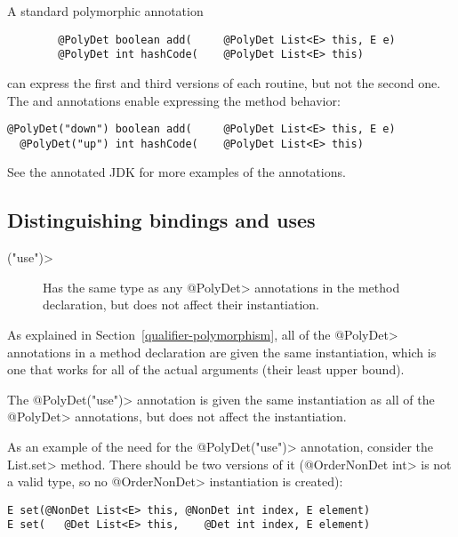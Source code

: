 A standard polymorphic annotation

\begin{Verbatim}
        @PolyDet boolean add(     @PolyDet List<E> this, E e)
        @PolyDet int hashCode(    @PolyDet List<E> this)
\end{Verbatim}

\noindent
can express the first and third versions of each routine, but not the
second one.  The  and
 annotations enable
expressing the method behavior:

\begin{Verbatim}
@PolyDet("down") boolean add(     @PolyDet List<E> this, E e)
  @PolyDet("up") int hashCode(    @PolyDet List<E> this)
\end{Verbatim}

See the annotated JDK for more examples of the annotations.


\subsection{Distinguishing bindings and uses\label{determinism-polymorphism-binding}}

\begin{description}
\item[\<("use")>]
  Has the same type as any \<@PolyDet> annotations in the method
  declaration, but does not affect their instantiation.
\end{description}

As explained in Section~\ref{qualifier-polymorphism},
all of the \<@PolyDet> annotations in a method declaration are given the same
instantiation, which is one that works for all of the actual arguments
(their least upper bound).

The \<@PolyDet("use")> annotation is given the same instantiation as all of the
\<@PolyDet> annotations, but does not affect the instantiation.

As an example of the need for the \<@PolyDet("use")> annotation, consider the
\<List.set> method.  There should be two versions of it (\<@OrderNonDet
int> is not a valid type, so no \<@OrderNonDet> instantiation is created):

\begin{Verbatim}
E set(@NonDet List<E> this, @NonDet int index, E element)
E set(   @Det List<E> this,    @Det int index, E element)
\end{Verbatim}

